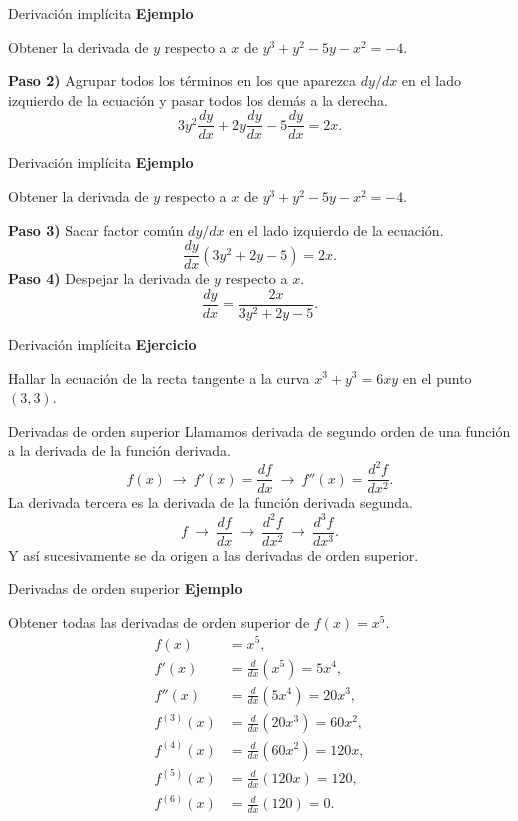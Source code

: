 \documentclass[original_version/main.tex]{subfiles}
\begin{document}
\begin{frame}{Derivación implícita}
\textbf{Ejemplo}\par Obtener la derivada de $y$ respecto a $x$ de $y^3+y^2-5y-x^2=-4$.\medskip

\textbf{Paso 2)} Agrupar todos los términos en los que aparezca $dy/dx$ en el lado izquierdo de la ecuación y pasar todos los demás a la derecha.
\[3y^2\frac{dy}{dx}+2y\frac{dy}{dx}-5\frac{dy}{dx}=2x.\]
\end{frame}
\begin{frame}{Derivación implícita}
\textbf{Ejemplo}\par Obtener la derivada de $y$ respecto a $x$ de $y^3+y^2-5y-x^2=-4$.\medskip

\textbf{Paso 3)} Sacar factor común $dy/dx$ en el lado izquierdo de la ecuación.
\[\frac{dy}{dx}(3y^2+2y-5)=2x.\]
\textbf{Paso 4)} Despejar la derivada de $y$ respecto a $x$.
\[\frac{dy}{dx}=\frac{2x}{3y^2+2y-5}.\]
\end{frame}
\begin{frame}{Derivación implícita}
\textbf{Ejercicio}\par\medskip Hallar la ecuación de la recta tangente a la curva $x^3+y^3=6xy$ en el punto $(3,3)$.
\end{frame}
\begin{frame}{Derivadas de orden superior}
Llamamos derivada de segundo orden de una función a la derivada de la función derivada.
\[f(x)\ \longrightarrow\ f'(x)=\frac{df}{dx}\ \longrightarrow\ f''(x)=\frac{d^2f}{dx^2}.\]
La derivada tercera es la derivada de la función derivada segunda.
\[f\ \longrightarrow\ \frac{df}{dx}\ \longrightarrow\ \frac{d^2f}{dx^2}\ \longrightarrow\ \frac{d^3f}{dx^3}.\]
Y así sucesivamente se da origen a las derivadas de orden superior.
\end{frame}
\begin{frame}{Derivadas de orden superior}
\small\textbf{Ejemplo}\par Obtener todas las derivadas de orden superior de $f(x)=x^5$.
\[\begin{aligned}
f(x)&=x^5,\\
f'(x)&=\frac{d}{dx}(x^5)=5x^4,\\
f''(x)&=\frac{d}{dx}(5x^4)=20x^3,\\
f^{(3)}(x)&=\frac{d}{dx}(20x^3)=60x^2,\\
f^{(4)}(x)&=\frac{d}{dx}(60x^2)=120x,\\
f^{(5)}(x)&=\frac{d}{dx}(120x)=120,\\
f^{(6)}(x)&=\frac{d}{dx}(120)=0.
\end{aligned}\]
\end{frame}
\end{document}
